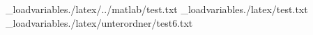 \_loadvariables{./latex/../matlab/test.txt}
\_loadvariables{./latex/test.txt}
\_loadvariables{./latex/unterordner/test6.txt}
